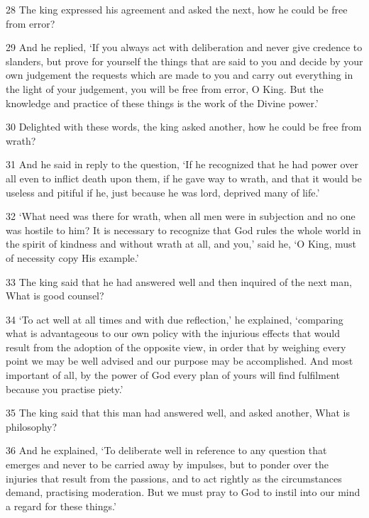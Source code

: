 \par 28 The king expressed his agreement and asked the next, how he could be free from error?

\par 29 And he replied, ‘If you always act with deliberation and never give credence to slanders, but prove for yourself the things that are said to you and decide by your own judgement the requests which are made to you and carry out everything in the light of your judgement, you will be free from error, O King. But the knowledge and practice of these things is the work of the Divine power.’

\par 30 Delighted with these words, the king asked another, how he could be free from wrath?

\par 31 And he said in reply to the question, ‘If he recognized that he had power over all even to inflict death upon them, if he gave way to wrath, and that it would be useless and pitiful if he, just because he was lord, deprived many of life.’

\par 32 ‘What need was there for wrath, when all men were in subjection and no one was hostile to him? It is necessary to recognize that God rules the whole world in the spirit of kindness and without wrath at all, and you,’ said he, ‘O King, must of necessity copy His example.’

\par 33 The king said that he had answered well and then inquired of the next man, What is good counsel?

\par 34 ‘To act well at all times and with due reflection,’ he explained, ‘comparing what is advantageous to our own policy with the injurious effects that would result from the adoption of the opposite view, in order that by weighing every point we may be well advised and our purpose may be accomplished. And most important of all, by the power of God every plan of yours will find fulfilment because you practise piety.’

\par 35 The king said that this man had answered well, and asked another, What is philosophy?

\par 36 And he explained, ‘To deliberate well in reference to any question that emerges and never to be carried away by impulses, but to ponder over the injuries that result from the passions, and to act rightly as the circumstances demand, practising moderation. But we must pray to God to instil into our mind a regard for these things.’

